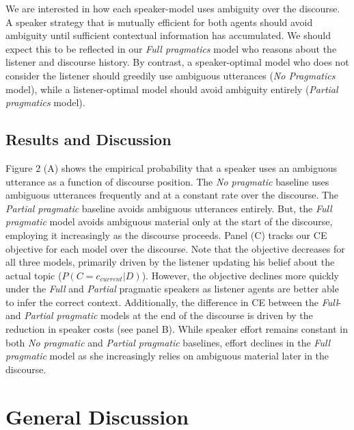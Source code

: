 \documentclass[10pt, letterpaper]{article}
\begin{document}
We are interested in how each speaker-model uses ambiguity over the
discourse. A speaker strategy that is mutually efficient for both agents
should avoid ambiguity until sufficient contextual information has
accumulated. We should expect this to be reflected in our
\textit{Full pragmatics} model who reasons about the listener and
discourse history. By contrast, a speaker-optimal model who does not
consider the listener should greedily use ambiguous utterances
(\textit{No Pragmatics} model), while a listener-optimal model should
avoid ambiguity entirely (\textit{Partial pragmatics} model).\par

\subsection{Results and Discussion}\label{results-and-discussion-1}

Figure 2 (A) shows the empirical probability that a speaker uses an
ambiguous utterance as a function of discourse position. The
\textit{No pragmatic} baseline uses ambiguous utterances frequently and
at a constant rate over the discourse. The \textit{Partial pragmatic}
baseline avoids ambiguous utterances entirely. But, the
\textit{Full pragmatic} model avoids ambiguous material only at the
start of the discourse, employing it increasingly as the discourse
proceeds. Panel (C) tracks our CE objective for each model over the
discourse. Note that the objective decreases for all three models,
primarily driven by the listener updating his belief about the actual
topic (\(P(C=c_{current}|D)\)). However, the objective declines more
quickly under the \textit{Full} and \textit{Partial} pragmatic speakers
as listener agents are better able to infer the correct context.
Additionally, the difference in CE between the \textit{Full}- and
\textit{Partial pragmatic} models at the end of the discourse is driven
by the reduction in speaker costs (see panel B). While speaker effort
remains constant in both \textit{No pragmatic} and
\textit{Partial pragmatic} baselines, effort declines in the
\textit{Full pragmatic} model as she increasingly relies on ambiguous
material later in the discourse.\par

\section{General Discussion}\label{general-discussion}
\end{document}
